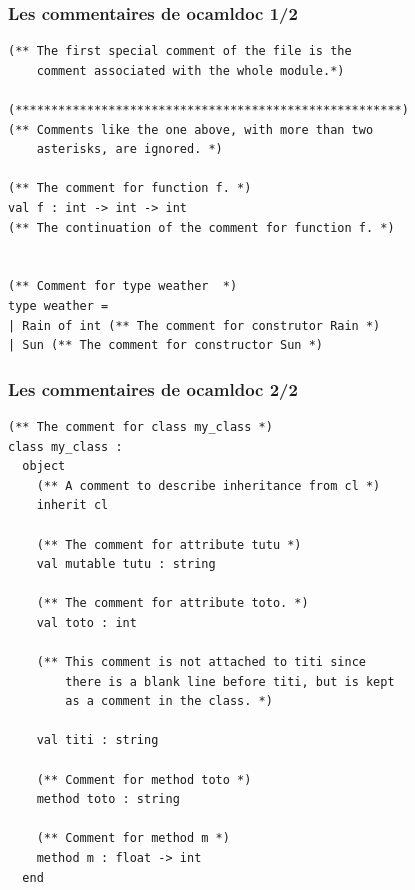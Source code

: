 \begin{frame}[fragile]
	\frametitle{Les commentaires de ocamldoc 1/2}
	\lstset{basicstyle=\scriptsize}	
	\begin{lstlisting}
(** The first special comment of the file is the
    comment associated with the whole module.*)

(******************************************************)
(** Comments like the one above, with more than two
    asterisks, are ignored. *)

(** The comment for function f. *)
val f : int -> int -> int
(** The continuation of the comment for function f. *)


(** Comment for type weather  *)
type weather =
| Rain of int (** The comment for construtor Rain *)
| Sun (** The comment for constructor Sun *)
	\end{lstlisting}
\end{frame}

\begin{frame}[fragile]
	\frametitle{Les commentaires de ocamldoc 2/2}
	\lstset{basicstyle=\scriptsize}	
	\begin{lstlisting}
(** The comment for class my_class *)
class my_class :
  object
    (** A comment to describe inheritance from cl *)
    inherit cl

    (** The comment for attribute tutu *)
    val mutable tutu : string

    (** The comment for attribute toto. *)
    val toto : int

    (** This comment is not attached to titi since
        there is a blank line before titi, but is kept
        as a comment in the class. *)

    val titi : string

    (** Comment for method toto *)
    method toto : string

    (** Comment for method m *)
    method m : float -> int
  end
	\end{lstlisting}
\end{frame}

